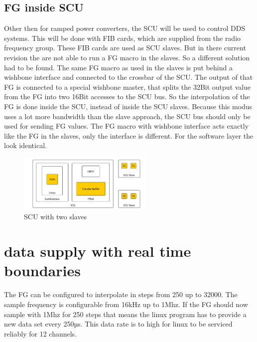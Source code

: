 \documentclass[a4paper,
              ]{jacow}
\begin{document}
\subsection{FG inside SCU}
Other then for ramped power converters, the SCU will be used to control DDS systems. This will be done with FIB cards, which are supplied from the radio frequency group. These FIB cards are used as SCU slaves. But in there current revision the are not able to run a FG macro in the slaves. So a different solution had to be found. The same FG macro as used in the slaves is put behind a wishbone interface and connected to the crossbar of the SCU. The output of that FG is connected to a special wishbone master, that splits the 32Bit output value from the FG into two 16Bit accesses to the SCU bus. So the interpolation of the FG is done inside the SCU, instead of inside the SCU slaves. Because this modus uses a lot more bandwidth than the slave approach, the SCU bus should only be used for sending FG values. The FG macro with wishbone interface acts exactly like the FG in the slaves, only the interface is different. For the software layer the look
identical.

\begin{figure}[!htb]
   \centering
   \includegraphics*[width=65mm]{data_linux2fg}
   \caption{SCU with two slaves}
   \label{fig1}
\end{figure}

\section{data supply with real time boundaries}
The FG can be configured to interpolate in steps from 250 up to 32000. The sample frequency is configurable from 16kHz up to 1Mhz. If the FG should now sample with 1Mhz for 250 steps
that means the linux program has to provide a new data set every 250µs. This data rate is to high for linux to be serviced reliably for 12 channels.
\end{document}
